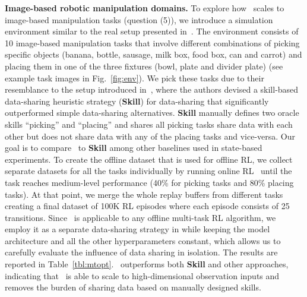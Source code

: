 \textbf{Image-based robotic manipulation domains.} To explore how \methodname\ scales to image-based manipulation tasks (question (5)), we introduce a simulation environment similar to the real setup presented in~\cite{kalashnikov2021mt}. The environment consists of 10 image-based manipulation tasks that involve different combinations of picking specific objects (banana, bottle, sausage, milk box, food box, can and carrot) and placing them in one of the three fixtures (bowl, plate and divider plate) (see example task images in Fig.~\ref{fig:env}).
We pick these tasks due to their resemblance to the setup introduced in~\cite{kalashnikov2021mt}, where the authors devised a skill-based data-sharing heuristic strategy (\textbf{Skill}) for data-sharing that significantly outperformed simple data-sharing alternatives. \textbf{Skill} manually defines two oracle skills ``picking'' and ``placing'' and shares all picking tasks share data with each other but does not share data with any of the placing tasks and vice-versa. Our goal is to compare \methodname\ to \textbf{Skill} among other baselines used in state-based experiments.
To create the offline dataset that is used for offline RL, we collect separate datasets for all the tasks individually by running online RL~\cite{kalashnikov2018scalable} until the task reaches medium-level performance (40\% for picking tasks and 80\% placing tasks). At that point, we merge the whole replay buffers from different tasks creating a final dataset of 100K RL episodes where each episode consists of 25 transitions. Since \methodname\ is applicable to any offline multi-task RL algorithm, we employ it as a separate data-sharing strategy in \citep{kalashnikov2021mt} while keeping the model architecture and all the other hyperparameters constant, which allows us to carefully evaluate the influence of data sharing in isolation. The results are reported in Table~\ref{tbl:mtopt}. \methodname\ outperforms both \textbf{Skill} and other approaches, indicating that \methodname\ is able to scale to high-dimensional observation inputs and removes the burden of sharing data based on manually designed skills.